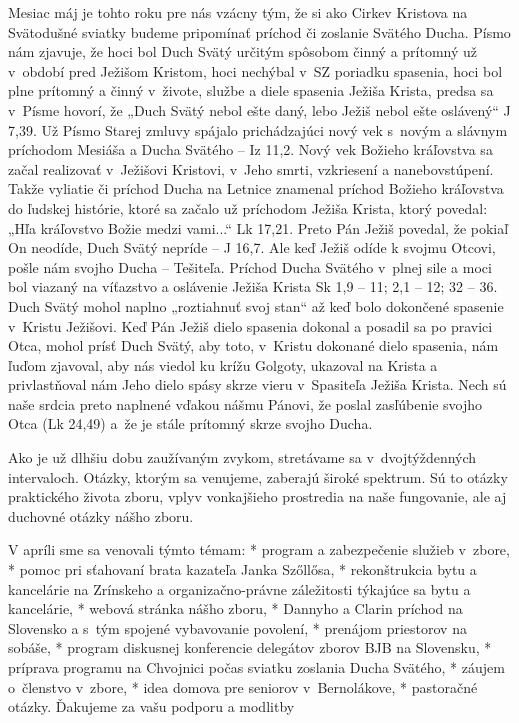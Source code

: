 Mesiac máj je tohto roku pre nás vzácny tým, že si ako Cirkev Kristova na Svätodušné sviatky budeme pripomínať príchod či zoslanie Svätého Ducha. Písmo nám zjavuje, že hoci bol Duch Svätý určitým spôsobom činný a prítomný už v~období pred Ježišom Kristom, hoci nechýbal v~SZ poriadku spasenia, hoci bol plne prítomný a činný v~živote, službe a diele spasenia Ježiša Krista, predsa sa v~Písme hovorí, že „Duch Svätý nebol ešte daný, lebo Ježiš nebol ešte oslávený“ J 7,39. Už Písmo Starej zmluvy spájalo prichádzajúci nový vek s~novým a slávnym príchodom Mesiáša a Ducha Svätého -- Iz 11,2. Nový vek Božieho kráľovstva sa začal realizovať v~Ježišovi Kristovi, v~Jeho smrti, vzkriesení a nanebovstúpení. Takže vyliatie či príchod Ducha na Letnice znamenal príchod Božieho kráľovstva do ľudskej histórie, ktoré sa začalo už príchodom Ježiša Krista, ktorý povedal: „Hľa kráľovstvo Božie medzi vami...“ Lk 17,21. Preto Pán Ježiš povedal, že pokiaľ On neodíde, Duch Svätý nepríde -- J 16,7. Ale keď Ježiš odíde k svojmu Otcovi, pošle nám svojho Ducha -- Tešiteľa. Príchod Ducha Svätého v~plnej sile a moci bol viazaný na víťazstvo a oslávenie Ježiša Krista Sk 1,9 -- 11; 2,1 -- 12; 32 -- 36. Duch Svätý mohol naplno „roztiahnuť svoj stan“ až keď bolo dokončené spasenie v~Kristu Ježišovi. Keď Pán Ježiš dielo spasenia dokonal a posadil sa po pravici Otca, mohol prísť Duch Svätý, aby toto, v~Kristu dokonané dielo spasenia, nám ľuďom zjavoval, aby nás viedol ku krížu Golgoty, ukazoval na Krista a privlastňoval nám Jeho dielo spásy skrze vieru v~Spasiteľa Ježiša Krista. Nech sú naše srdcia preto naplnené vďakou nášmu Pánovi, že poslal zasľúbenie svojho Otca (Lk 24,49) a~že je stále prítomný skrze svojho Ducha.



Ako je už dlhšiu dobu zaužívaným zvykom, stretávame sa v~dvojtýždenných intervaloch. Otázky, ktorým sa venujeme, zaberajú široké spektrum. Sú to otázky praktického života zboru, vplyv vonkajšieho prostredia na naše fungovanie, ale aj duchovné otázky nášho zboru.

V apríli sme sa venovali týmto témam:
\begitems
* program a zabezpečenie služieb v~zbore,
* pomoc pri sťahovaní brata kazateľa Janka Szőllősa,
* rekonštrukcia bytu a kancelárie na Zrínskeho a organizačno-právne záležitosti týkajúce sa bytu a kancelárie,
* webová stránka nášho zboru,
* Dannyho a Clarin príchod na Slovensko a s~tým spojené vybavovanie povolení,
* prenájom priestorov na sobáše,
* program diskusnej konferencie delegátov zborov BJB na Slovensku,
* príprava programu na Chvojnici počas sviatku zoslania Ducha Svätého,
* záujem o~členstvo v~zbore,
* idea domova pre seniorov v~Bernolákove,
* pastoračné otázky.
\enditems
Ďakujeme za vašu podporu a modlitby
 
